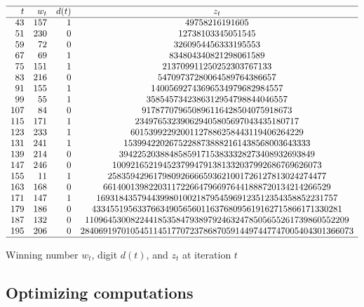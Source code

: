 \documentclass[oneside,10pt]{book}
\renewcommand{\arraystretch}{1.4} %
\begin{document}
\begin{table}%
\small
\setlength\extrarowheight{-2pt}
\[
\begin{array}{rrrc}
\hline
t	&  w_t & d(t) & z_t\\
\hline
  43 &  157 &  1 & 49758216191605 \\
  51 &  230 &  0 & 12738103345051545 \\
  59 &   72 &  0 & 3260954456333195553 \\
  67 &   69 &  1 & 834804340821298061589 \\
  75 &  151 &  1 & 213709911250252303767133 \\
  83 &  216 &  0 & 54709737280064589764386657 \\
  91 &  155 &  1 & 14005692743696534979682984557 \\
  99 &   55 &  1 & 3585457342386312954798844046557 \\
 107 &   84 &  0 & 917877079650896116428504075918673 \\
 115 &  171 &  1 & 234976532390629405805697043435180717 \\
 123 &  233 &  1 & 60153992292001127886258443119406264229 \\
 131 &  241 &  1 & 15399422026752288738882161438568003643333 \\
 139 &  214 &  0 & 3942252038848585917153833328273408932693849 \\
 147 &  246 &  0 & 1009216521945237994791381332037992686769626073 \\
 155 &   11 &  1 & 258359429617980926666593621001726127813024274477 \\
 163 &  168 &  0 & 66140013982203117226647966976441888720134214266529 \\
 171 &  147 &  1 & 16931843579443998010021879545969123512354358852231757 \\
 179 &  186 &  0 & 4334551956337663490565601163768095619162715866171330281 \\
 187 &  132 &  0 & 1109645300822441853584793897924632478505655261739860552209 \\
 195 &  206 &  0 & 284069197010545114517707237868705914497447747005404301366073 \\
\hline
\end{array}
\]
\caption{\label{tabtres} Winning number $w_t$, digit $d(t)$, and $z_t$ at iteration $t$}
\end{table}
\renewcommand{\arraystretch}{1.0} %


\subsection{Optimizing computations}\label{puosaw}
\end{document}
